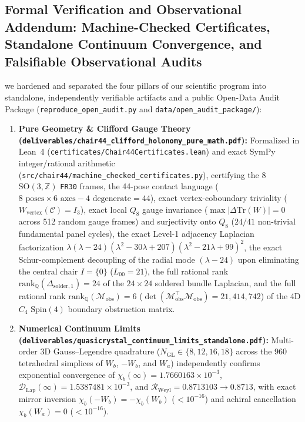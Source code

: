 \documentclass[11pt,a4paper]{article}
\theoremstyle{definition}
\begin{document}
\subsection{Formal Verification and Observational Addendum: Machine-Checked Certificates, Standalone Continuum Convergence, and Falsifiable Observational Audits}
we hardened and separated the four pillars of our scientific program into standalone, independently verifiable artifacts and a public Open-Data Audit Package (\texttt{reproduce\_open\_audit.py} and \texttt{data/open\_audit\_package/}):
\begin{enumerate}
    \item \textbf{Pure Geometry \& Clifford Gauge Theory (\texttt{deliverables/chair44\_clifford\_holonomy\_pure\_math.pdf}):} Formalized in Lean~4 (\texttt{certificates/Chair44Certificates.lean}) and exact SymPy integer/rational arithmetic (\texttt{src/chair44/machine\_checked\_certificates.py}), certifying the 8 $\mathrm{SO}(3,\mathbb{Z})$ \texttt{FR30} frames, the 44-pose contact language ($8\text{ poses}\times 6\text{ axes}-4\text{ degenerate}=44$), exact vertex-coboundary triviality ($W_{\mathrm{vertex}}(\mathcal{C})=I_3$), exact local $Q_8$ gauge invariance ($\max|\Delta\mathrm{Tr}(W)|=0$ across 512 random gauge frames) and surjectivity onto $Q_8$ ($24/41$ non-trivial fundamental panel cycles), the exact Level-1 adjacency Laplacian factorization $\lambda(\lambda-24)(\lambda^2-30\lambda+207)(\lambda^2-21\lambda+99)^2$, the exact Schur-complement decoupling of the radial mode $(\lambda-24)$ upon eliminating the central chair $I=\{0\}$ ($L_{00}=21$), the full rational rank $\mathrm{rank}_{\mathbb{Q}}(\Delta_{\mathrm{solder},1})=24$ of the $24\times 24$ soldered bundle Laplacian, and the full rational rank $\mathrm{rank}_{\mathbb{Q}}(\mathcal{M}_{\mathrm{obs}})=6$ ($\det(\mathcal{M}_{\mathrm{obs}}^\top\mathcal{M}_{\mathrm{obs}})=21{,}414{,}742$) of the 4D $C_4$ $\mathrm{Spin}(4)$ boundary obstruction matrix.
    \item \textbf{Numerical Continuum Limits (\texttt{deliverables/quasicrystal\_continuum\_limits\_standalone.pdf}):} Multi-order 3D Gauss--Legendre quadrature ($N_{\mathrm{GL}}\in\{8,12,16,18\}$ across the 960 tetrahedral simplices of $W_b$, $-W_b$, and $W_a$) independently confirms exponential convergence of $\chi_b(\infty)=1.7660163\times 10^{-3}$, $\mathcal{D}_{\mathrm{Lap}}(\infty)=1.5387481\times 10^{-3}$, and $\mathcal{R}_{\mathrm{Weyl}}=0.8713103\to 0.8713$, with exact mirror inversion $\chi_b(-W_b)=-\chi_b(W_b)$ ($<10^{-16}$) and achiral cancellation $\chi_b(W_a)=0$ ($<10^{-16}$).

\end{enumerate}
\end{document}
